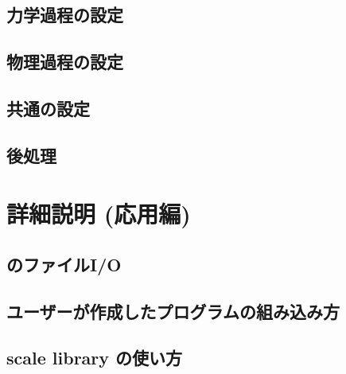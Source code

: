 \documentclass[a4paper]{jreport}
\begin{document}
 \chapter{力学過程の設定}
 


 \chapter{物理過程の設定} \label{sec:basic_usel_physics}

 \chapter{共通の設定}


 \chapter{後処理} \label{sec:basic_usel_post}
 

 \part{詳細説明 (応用編)} \label{part:advance}
 \chapter{\scalelib のファイルI/O}
 

 \chapter{ユーザーが作成したプログラムの組み込み方}
 \chapter{scale library  の使い方}
\end{document}
